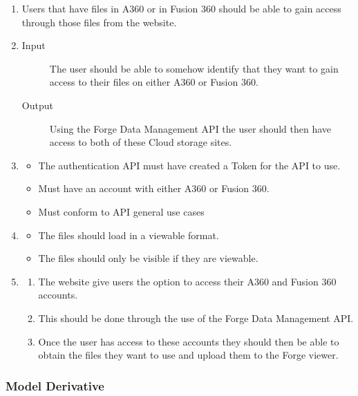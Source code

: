 \documentclass[letterpaper, 10pt, draftclsnofoot, compsoc, onecolumn]{IEEEtran}
\begin{document}
\begin{enumerate}
	\item Users that have files in A360 or in Fusion 360 should be able to gain access through those files from the
	website.

	\item
	\begin{description} 
		\item[Input] The user should be able to somehow identify that they want to gain access to their files on either A360
	or Fusion 360. 
		\item[Output] Using the Forge Data Management API the user should then have access to both of these Cloud storage sites.
	\end{description}

	\item
	\begin{itemize}
		\item The authentication API must have created a Token for the API to use.
		\item Must have an account with either A360 or Fusion 360. 
		\item Must conform to API general use cases
	\end{itemize}

	\item
	\begin{itemize}
		\item The files should load in a viewable format.
		\item The files should only be visible if they are viewable.
	\end{itemize}
	
	\item 
	\begin{enumerate}
		\item The website give users the option to access their A360 and Fusion 360 accounts. 
		\item This should be done through the use of the Forge Data Management API. 
		\item Once the user has access to these accounts they should then be able to obtain the 
		files they want to use and upload them to the Forge viewer.
	\end{enumerate}
\end{enumerate}

\subsubsection{Model Derivative}
\end{document}
